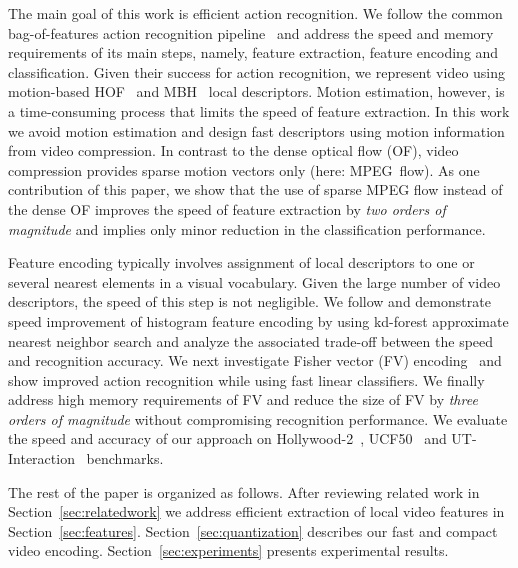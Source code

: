 \documentclass[10pt,twocolumn,letterpaper]{article}
\begin{document}
The main goal of this work is efficient action recognition. We follow the common bag-of-features action recognition pipeline~\cite{Laptev08,Schuldt04,Wang12} and address the speed and memory requirements of its main steps, namely, feature extraction, feature encoding and classification. 
Given their success for action recognition, we represent video using motion-based HOF~\cite{Laptev08} and MBH~\cite{Wang12} local descriptors.
Motion estimation, however, is a time-consuming process that limits the speed of feature extraction.
In this work we avoid motion estimation and design fast descriptors using motion information from video compression.
In contrast to the dense optical flow (OF), video compression provides sparse motion vectors only (here: MPEG~flow).
As one contribution of this paper, we show that the use of sparse MPEG flow instead of the dense OF improves the speed of feature extraction by {\em two orders of magnitude} and implies only minor reduction in the classification performance.

Feature encoding typically involves assignment of local descriptors to one or several nearest elements in a visual vocabulary. Given the large number of video descriptors, the speed of this step is not negligible. We follow \cite{Philbin07} and demonstrate speed improvement of histogram feature encoding by using kd-forest approximate nearest neighbor search and analyze the associated trade-off between the speed and recognition accuracy. We next investigate Fisher vector (FV) encoding~\cite{Perronnin12} and show improved action recognition while using fast linear classifiers.
We finally address high memory requirements of FV and reduce the size of FV by {\em three orders of magnitude} without compromising recognition performance.
We evaluate the speed and accuracy of our approach on \mbox{Hollywood-2}~\cite{Marszalek09}, UCF50~\cite{Reddy12} and UT-Interaction~\cite{Ryoo10} benchmarks. %

The rest of the paper is organized as follows. 
After reviewing related work in Section~\ref{sec:relatedwork} we address efficient extraction of local video features in Section~\ref{sec:features}. Section~\ref{sec:quantization} describes our fast and compact video encoding. Section~\ref{sec:experiments} presents experimental results.
\end{document}
